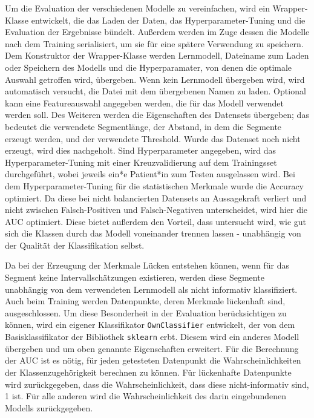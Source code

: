 Um die Evaluation der verschiedenen Modelle zu vereinfachen, wird ein Wrapper-Klasse entwickelt, die das Laden der Daten, das Hyperparameter-Tuning und die Evaluation der Ergebnisse bündelt. Außerdem werden im Zuge dessen die Modelle nach dem Training serialisiert, um sie für eine spätere Verwendung zu speichern. Dem Konstruktor der Wrapper-Klasse werden Lernmodell, Dateiname zum Laden oder Speichern des Modells und die Hyperparamater, von denen die optimale Auswahl getroffen wird, übergeben. Wenn kein Lernmodell übergeben wird, wird automatisch versucht, die Datei mit dem übergebenen Namen zu laden. Optional kann eine Featureauswahl angegeben werden, die für das Modell verwendet werden soll. Des Weiteren werden die Eigenschaften des Datensets übergeben; das bedeutet die verwendete Segmentlänge, der Abstand, in dem die Segmente erzeugt werden, und der verwendete Threshold. Wurde das Datenset noch nicht erzeugt, wird dies nachgeholt. Sind Hyperparameter angegeben, wird das Hyperparameter-Tuning mit einer Kreuzvalidierung auf dem Trainingsset durchgeführt, wobei jeweils ein*e Patient*in zum Testen ausgelassen wird. Bei dem Hyperparameter-Tuning für die statistischen Merkmale wurde die Accuracy optimiert. Da diese bei nicht balancierten Datensets an Aussagekraft verliert und nicht zwischen Falsch-Positiven und Falsch-Negativen unterscheidet, wird hier die \ac{AUC} optimiert. Diese bietet außerdem den Vorteil, dass untersucht wird, wie gut sich die Klassen durch das Modell voneinander trennen lassen - unabhängig von der Qualität der Klassifikation selbst.


Da bei der Erzeugung der Merkmale Lücken entstehen können, wenn für das Segment keine Intervallschätzungen existieren, werden diese Segmente unabhängig von dem verwendeten Lernmodell als nicht informativ klassifiziert. Auch beim Training werden Datenpunkte, deren Merkmale lückenhaft sind, ausgeschlossen. Um diese Besonderheit in der Evaluation berücksichtigen zu können, wird ein eigener Klassifikator \texttt{OwnClassifier} entwickelt, der von dem Basisklassifikator der Bibliothek \texttt{sklearn} erbt. Diesem wird ein anderes Modell übergeben und um oben genannte Eigenschaften erweitert. Für die Berechnung der \ac{AUC} ist es nötig, für jeden getesteten Datenpunkt die Wahrscheinlichkeiten der Klassenzugehörigkeit berechnen zu können. Für lückenhafte Datenpunkte wird zurückgegeben, dass die Wahrscheinlichkeit, dass diese nicht-informativ sind, 1 ist. Für alle anderen wird die Wahrscheinlichkeit des darin eingebundenen Modells zurückgegeben.%

